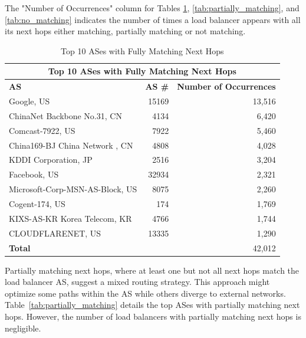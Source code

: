 \documentclass[12pt]{cwru_thesis}
\begin{document}
The "Number of Occurrences" column for Tables \ref{tab:fully_matching}, \ref{tab:partially_matching}, and \ref{tab:no_matching} indicates the number of times a load balancer appears with all its next hops either matching, partially matching or not matching.

\begin{table}[h!]
    \centering
    \begin{tabular}{|l|r|r|}
        \hline
        \multicolumn{3}{|c|}{\textbf{Top 10 ASes with Fully Matching Next Hops}} \\
        \hline
        \textbf{AS} & \textbf{AS \#} & \textbf{Number of Occurrences} \\
        \hline
        Google, US & 15169 & 13,516 \\
        ChinaNet Backbone No.31, CN & 4134 & 6,420 \\
        Comcast-7922, US & 7922 & 5,460 \\
        China169-BJ China Network , CN & 4808 & 4,028 \\
        KDDI Corporation, JP & 2516 & 3,204 \\
        Facebook, US & 32934 & 2,321 \\
        Microsoft-Corp-MSN-AS-Block, US & 8075 & 2,260 \\
        Cogent-174, US & 174 & 1,769 \\
        KIXS-AS-KR Korea Telecom, KR & 4766 & 1,744 \\
        CLOUDFLARENET, US & 13335 & 1,290 \\
        \hline
        \textbf{Total} & & 42,012 \\
        \hline
    \end{tabular}
    \caption{Top 10 ASes with Fully Matching Next Hops}
    \label{tab:fully_matching}
\end{table}
  \newpage
Partially matching next hops, where at least one but not all next hops match the load balancer AS, suggest a mixed routing strategy. This approach might optimize some paths within the AS while others diverge to external networks. Table~\ref{tab:partially_matching} details the top ASes with partially matching next hops. However, the number of load balancers with partially matching next hops is negligible.
\end{document}

